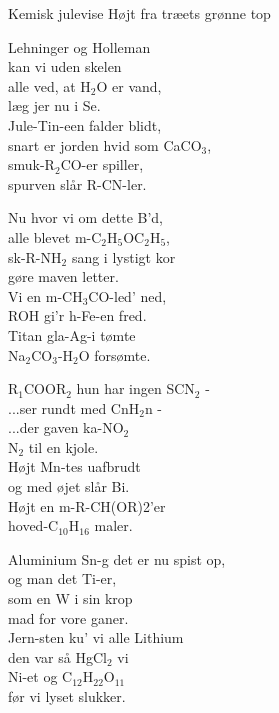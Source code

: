 \begin{song}{Kemisk julevise}
  {} %
  {Højt fra træets grønne top} %
  {} %
  {} %
  {\NotCCLIed} %

  \begin{SBVerse}
    Lehninger og Holleman\\
    kan vi uden skelen\\
    alle ved, at H$_2$O er vand,\\
    læg jer nu i Se.\\
    Jule-Tin-een falder blidt,\\
    snart er jorden hvid som CaCO$_3$,\\
    smuk-R$_2$CO-er spiller,\\
    spurven slår R-CN-ler.
  \end{SBVerse}

  \begin{SBVerse}
    Nu hvor vi om dette B'd,\\
    alle blevet m-C$_2$H$_5$OC$_2$H$_5$,\\
    sk-R-NH$_2$ sang i lystigt kor\\
    gøre maven letter.\\
    Vi en m-CH$_3$CO-led' ned,\\
    ROH gi'r h-Fe-en fred.\\
    Titan gla-Ag-i tømte\\
    Na$_2$CO$_3$-H$_2$O forsømte.
  \end{SBVerse}

  \begin{SBVerse}
    R$_1$COOR$_2$ hun har ingen SCN$_2$ -\\
    ...ser rundt med CnH$_2$n -\\
    ...der gaven ka-NO$_2$\\
    N$_2$ til en kjole.\\
    Højt Mn-tes uafbrudt\\
    og med øjet slår Bi.\\
    Højt en m-R-CH(OR)2'er\\
    hoved-C$_{10}$H$_{16}$ maler.
  \end{SBVerse}

  \begin{SBVerse}
    Aluminium Sn-g det er nu spist op,\\
    og man det Ti-er,\\
    som en W i sin krop\\
    mad for vore ganer.\\
    Jern-sten ku' vi alle Lithium\\
    den var så HgCl$_2$ vi\\
    Ni-et og C$_{12}$H$_{22}$O$_{11}$\\
    før vi lyset slukker.
  \end{SBVerse}
\end{song}